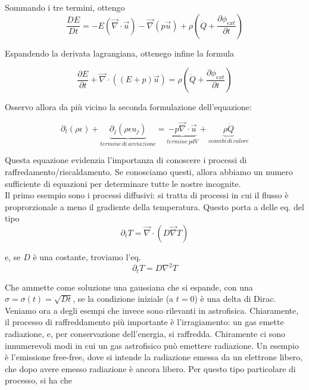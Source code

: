 \documentclass{report}
\begin{document}
Sommando i tre termini, ottengo
\begin{equation}
    \frac{DE}{Dt} = -E(\vec{\nabla}\cdot\vec{u}) - \vec{\nabla}(p\vec{u}) + \rho\left(\dot{Q} + \frac{\partial \phi_{ext}}{\partial t}\right)
\end{equation}

Espandendo la derivata lagrangiana, ottenego infine la formula 

\begin{equation}
    \frac{\partial E}{\partial t} + \vec{\nabla} \cdot ((E+p)\vec{u}) = \rho \left(\dot{Q} + \frac{\partial \phi_{ext}}{\partial t}\right)
\end{equation}

Osservo allora da più vicino la seconda formulazione dell'equazione: 

\begin{equation}
    \partial_t(\rho\epsilon) + \underbrace{\partial_j(\rho\epsilon u_j)}_{termine \, di \, avviazione} = \underbrace{-p\vec{\nabla} \cdot \vec{u}}_{termine \, pdV} + \underbrace{\rho\dot{Q}}_{scambi \, di \, calore}
\end{equation}

Questa equazione evidenzia l'importanza di conoscere i processi di raffredamento/riscaldamento. Se conosciamo questi, allora abbiamo un numero sufficiente di equazioni per determinare tutte le nostre incognite. \\

Il primo esempio sono i processi diffusivi: si tratta di processi in cui il flusso è proprorzionale a meno il gradiente della temperatura. Questo porta a delle eq. del tipo 
\begin{equation}
    \partial_t T = \vec{\nabla} \cdot (D\vec{\nabla}T)
\end{equation}

e, se $D$ è una costante, troviamo l'eq. 
\begin{equation}
    \partial_t T = D\nabla^2T
\end{equation}

Che ammette come soluzione una gaussiana che si espande, con una $\sigma = \sigma(t) = \sqrt{D t}$, se la condizione iniziale (a $t=0$) è una delta di Dirac. \\

Veniamo ora a degli esempi che invece sono rilevanti in astrofisica. Chiaramente, il processo di raffreddamento più importante è l'irragiamento: un gas emette radiazione, e, per conservazione dell'energia, si raffredda. Chiramente ci sono innumerevoli modi in cui un gas astrofisico può emettere radiazione. Un esempio è l'emissione free-free, dove si intende la radiazione emessa da un elettrone libero, che dopo avere emesso radiazione è ancora libero. Per questo tipo particolare di processo, si ha che 
\end{document}
